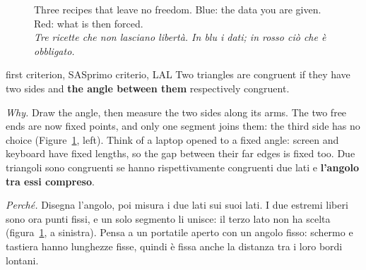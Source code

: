 \documentclass[10pt,a4paper,oneside]{book}
\newcommand{\bicap}[2]{\caption{#1\\{\color{itgreen}\itshape #2}}}
\begin{document}
\begin{figure}[htbp]
\bicap{Three recipes that leave no freedom. Blue: the data you are given. Red: what is then forced.}%
      {Tre ricette che non lasciano libertà. In blu i dati; in rosso ciò che è obbligato.}
\label{fig:criteria}
\end{figure}

\begin{defn}{first criterion, SAS}{primo criterio, LAL}
Two triangles are congruent if they have two sides and \textbf{the angle between them} respectively congruent.

\emph{Why.} Draw the angle, then measure the two sides along its arms. The two free ends are now fixed points, and only one segment joins them: the third side has no choice (Figure~\ref{fig:criteria}, left). Think of a laptop opened to a fixed angle: screen and keyboard have fixed lengths, so the gap between their far edges is fixed too.
\tcblower
Due triangoli sono congruenti se hanno rispettivamente congruenti due lati e \textbf{l'angolo tra essi compreso}.

\emph{Perché.} Disegna l'angolo, poi misura i due lati sui suoi lati. I due estremi liberi sono ora punti fissi, e un solo segmento li unisce: il terzo lato non ha scelta (figura~\ref{fig:criteria}, a sinistra). Pensa a un portatile aperto con un angolo fisso: schermo e tastiera hanno lunghezze fisse, quindi è fissa anche la distanza tra i loro bordi lontani.
\end{defn}
\end{document}
